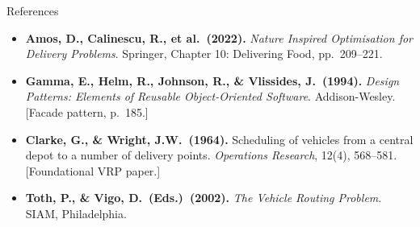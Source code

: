 \documentclass[aspectratio=169,10pt]{beamer}
\begin{document}
\begin{frame}{References}
  \begin{itemize}
    \item \textbf{Amos, D., Calinescu, R., et al.\ (2022).}
          \textit{Nature Inspired Optimisation for Delivery Problems}.
          Springer, Chapter 10: Delivering Food, pp.\ 209--221.
    \item \textbf{Gamma, E., Helm, R., Johnson, R., \& Vlissides, J.\ (1994).}
          \textit{Design Patterns: Elements of Reusable Object-Oriented
          Software}.  Addison-Wesley.
          [Facade pattern, p.\ 185.]
    \item \textbf{Clarke, G., \& Wright, J.W.\ (1964).}
          Scheduling of vehicles from a central depot to a number of
          delivery points.
          \textit{Operations Research}, 12(4), 568--581.
          [Foundational VRP paper.]
    \item \textbf{Toth, P., \& Vigo, D.\ (Eds.)\ (2002).}
          \textit{The Vehicle Routing Problem}.
          SIAM, Philadelphia.
  \end{itemize}
\end{frame}
\end{document}
